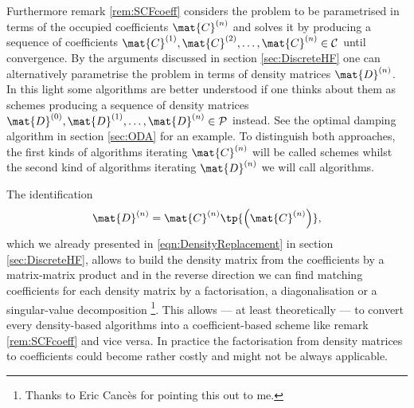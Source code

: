 Furthermore remark \ref{rem:SCFcoeff}
considers the \HF problem to be parametrised
in terms of the occupied coefficients $\mat{C}^{(n)}$
and solves it by producing a sequence of coefficients
$\mat{C}^{(1)}, \mat{C}^{(2)}, \ldots, \mat{C}^{(n)} \in \mathcal{C}$
until convergence.
By the arguments discussed in section \ref{sec:DiscreteHF}
one can alternatively parametrise the \HF problem in terms of
density matrices $\mat{D}^{(n)}$.
In this light some \SCF algorithms are better understood
if one thinks about them as schemes producing
a sequence of density matrices
$\mat{D}^{(0)}, \mat{D}^{(1)}, \ldots, \mat{D}^{(n)} \in \mathcal{P}$
instead.
See the optimal damping algorithm in section \vref{sec:ODA} for an example.
To distinguish both approaches,
the first kinds of algorithms iterating $\mat{C}^{(n)}$
will be called  schemes
whilst the second kind of algorithms iterating $\mat{D}^{(n)}$
we will call  algorithms.

\noindent
The identification
\[ \mat{D}^{(n)} = \mat{C}^{(n)} \tp{\left(\mat{C}^{(n)}\right)}, \]
which we already presented in \eqref{eqn:DensityReplacement} in section \ref{sec:DiscreteHF},
allows to build the density matrix from the coefficients by a matrix-matrix product
and in the reverse direction we can find matching coefficients for each density
matrix by a factorisation,
\eg a diagonalisation or a singular-value decomposition%
\footnote{Thanks to Eric Cancès for pointing this out to me.}.
This allows --- at least theoretically --- to convert
every density-based algorithms
into a coefficient-based scheme like remark \ref{rem:SCFcoeff}
and vice versa.
In practice the factorisation from density matrices to coefficients
could become rather costly and might not be always applicable.
